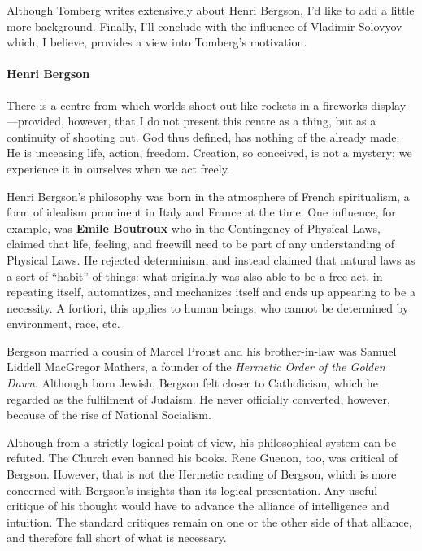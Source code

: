Although Tomberg writes extensively about Henri Bergson, I'd like to add a little more background. Finally, I'll conclude with the influence of Vladimir Solovyov which, I believe, provides a view into Tomberg's motivation.

\paragraph{Henri Bergson}


\begin{quotex} There is a centre from which worlds shoot out like rockets in a fireworks display---provided, however, that I do not present this centre as a thing, but as a continuity of shooting out. God thus defined, has nothing of the already made; He is unceasing life, action, freedom. Creation, so conceived, is not a mystery; we experience it in ourselves when we act freely.
\end{quotex}


Henri Bergson's philosophy was born in the atmosphere of French spiritualism, a form of idealism prominent in Italy and France at the time. One influence, for example, was \textbf{Emile Boutroux} who in the Contingency of Physical Laws, claimed that life, feeling, and freewill need to be part of any understanding of Physical Laws. He rejected determinism, and instead claimed that natural laws as a sort of ``habit'' of things: what originally was also able to be a free act, in repeating itself, automatizes, and mechanizes itself and ends up appearing to be a necessity. A fortiori, this applies to human beings, who cannot be determined by environment, race, etc.

Bergson married a cousin of Marcel Proust and his brother-in-law was Samuel Liddell MacGregor Mathers, a founder of the \emph{Hermetic Order of the Golden Dawn}. Although born Jewish, Bergson felt closer to Catholicism, which he regarded as the fulfilment of Judaism. He never officially converted, however, because of the rise of National Socialism.

Although from a strictly logical point of view, his philosophical system can be refuted. The Church even banned his books. Rene Guenon, too, was critical of Bergson. However, that is not the Hermetic reading of Bergson, which is more concerned with Bergson's insights than its logical presentation. Any useful critique of his thought would have to advance the alliance of intelligence and intuition. The standard critiques remain on one or the other side of that alliance, and therefore fall short of what is necessary.

